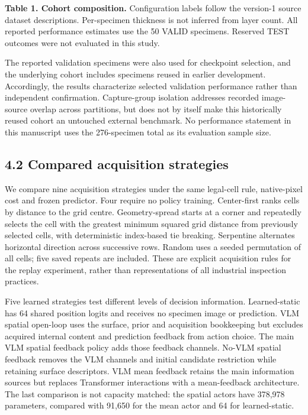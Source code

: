 \textbf{Table 1. Cohort composition.} Configuration labels follow the version-1 source dataset descriptions. Per-specimen thickness is not inferred from layer count. All reported performance estimates use the 50 VALID specimens. Reserved TEST outcomes were not evaluated in this study.

The reported validation specimens were also used for checkpoint selection, and the underlying cohort includes specimens reused in earlier development. Accordingly, the results characterize selected validation performance rather than independent confirmation. Capture-group isolation addresses recorded image-source overlap across partitions, but does not by itself make this historically reused cohort an untouched external benchmark. No performance statement in this manuscript uses the 276-specimen total as its evaluation sample size.

\subsection{4.2 Compared acquisition strategies}\label{compared-acquisition-strategies}

We compare nine acquisition strategies under the same legal-cell rule, native-pixel cost and frozen predictor. Four require no policy training. Center-first ranks cells by distance to the grid centre. Geometry-spread starts at a corner and repeatedly selects the cell with the greatest minimum squared grid distance from previously selected cells, with deterministic index-based tie breaking. Serpentine alternates horizontal direction across successive rows. Random uses a seeded permutation of all cells; five saved repeats are included. These are explicit acquisition rules for the replay experiment, rather than representations of all industrial inspection practices.

Five learned strategies test different levels of decision information. Learned-static has 64 shared position logits and receives no specimen image or prediction. VLM spatial open-loop uses the surface, prior and acquisition bookkeeping but excludes acquired internal content and prediction feedback from action choice. The main VLM spatial feedback policy adds those feedback channels. No-VLM spatial feedback removes the VLM channels and initial candidate restriction while retaining surface descriptors. VLM mean feedback retains the main information sources but replaces Transformer interactions with a mean-feedback architecture. The last comparison is not capacity matched: the spatial actors have 378,978 parameters, compared with 91,650 for the mean actor and 64 for learned-static.

